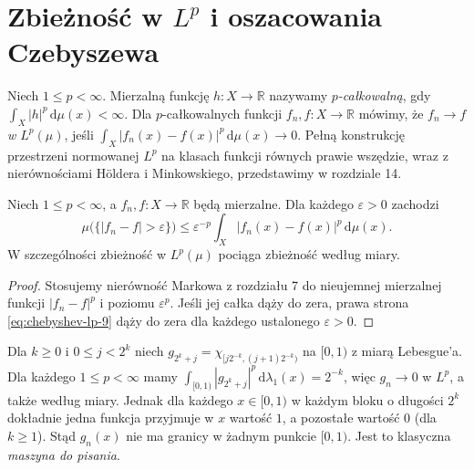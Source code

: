 \section{Zbieżność w $L^p$ i oszacowania Czebyszewa}

\begin{definicja}
\label{def:lp-convergence-9}
Niech $1\le p<\infty$. Mierzalną funkcję
$h:X\to\mathbb R$ nazywamy \emph{$p$-całkowalną},
gdy $\int_X|h|^p\,\mathrm d\mu(x)<\infty$.
Dla $p$-całkowalnych funkcji $f_n,f:X\to\mathbb R$
mówimy, że $f_n\to f$ \emph{w $L^p(\mu)$}, jeśli
$\int_X|f_n(x)-f(x)|^p\,\mathrm d\mu(x)\to0$.
Pełną konstrukcję przestrzeni normowanej $L^p$
na klasach funkcji równych prawie wszędzie,
wraz z nierównościami H\"oldera i Minkowskiego,
przedstawimy w rozdziale 14.
\end{definicja}

\begin{twierdzenie}
\label{thm:lp-implies-measure-9}
Niech $1\le p<\infty$, a $f_n,f:X\to\mathbb R$
będą mierzalne. Dla każdego $\varepsilon>0$ zachodzi
\begin{equation}\label{eq:chebyshev-lp-9}
\mu\bigl(\{|f_n-f|>\varepsilon\}\bigr)
\le\varepsilon^{-p}
\int_X|f_n(x)-f(x)|^p\,\mathrm d\mu(x).
\end{equation}
W szczególności zbieżność w $L^p(\mu)$ pociąga
zbieżność według miary.
\end{twierdzenie}
\begin{proof}
Stosujemy nierówność Markowa z rozdziału 7
do nieujemnej mierzalnej funkcji $|f_n-f|^p$
i poziomu $\varepsilon^p$. Jeśli jej całka dąży
do zera, prawa strona \eqref{eq:chebyshev-lp-9}
dąży do zera dla każdego ustalonego $\varepsilon>0$.
\end{proof}

\begin{przyklad}
\label{ex:typewriter-lp-9}
Dla $k\ge0$ i $0\le j<2^k$ niech
$g_{2^k+j}=\chi_{[j2^{-k},(j+1)2^{-k})}$
na $[0,1)$ z miarą Lebesgue'a. Dla każdego
$1\le p<\infty$ mamy
$\int_{[0,1)}|g_{2^k+j}|^p\,\mathrm d\lambda_1(x)=2^{-k}$,
więc $g_n\to0$ w $L^p$, a także według miary.
Jednak dla każdego $x\in[0,1)$ w każdym bloku o długości
$2^k$ dokładnie jedna funkcja przyjmuje w $x$
wartość $1$, a pozostałe wartość $0$ (dla $k\ge1$).
Stąd $g_n(x)$ nie ma granicy w żadnym punkcie $[0,1)$.
Jest to klasyczna \emph{maszyna do pisania}.
\end{przyklad}

